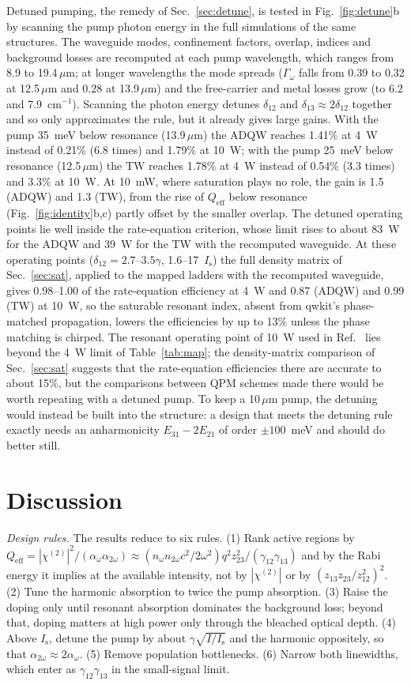 \documentclass[11pt]{article}
\newcommand{\chitwo}{\chi^{(2)}}
\newcommand{\um}{\,\mu\mathrm{m}}
\newcommand{\aw}{\alpha_{\omega}}
\newcommand{\aww}{\alpha_{2\omega}}
\newcommand{\Is}{I_\mathrm{s}}
\begin{document}
Detuned pumping, the remedy of Sec.~\ref{sec:detune}, is tested in Fig.~\ref{fig:detune}b by scanning the pump photon energy in the full simulations of the same structures. The waveguide modes, confinement factors, overlap, indices and background losses are recomputed at each pump wavelength, which ranges from 8.9 to 19.4$\um$; at longer wavelengths the mode spreads ($\Gamma_\omega$ falls from 0.39 to 0.32 at 12.5$\um$ and 0.28 at 13.9$\um$) and the free-carrier and metal losses grow (to 6.2 and 7.9~cm$^{-1}$). Scanning the photon energy detunes $\delta_{12}$ and $\delta_{13}\approx2\delta_{12}$ together and so only approximates the rule, but it already gives large gains. With the pump 35~meV below resonance (13.9$\um$) the ADQW reaches 1.41\% at 4~W instead of 0.21\% (6.8 times) and 1.79\% at 10~W; with the pump 25~meV below resonance (12.5$\um$) the TW reaches 1.78\% at 4~W instead of 0.54\% (3.3 times) and 3.3\% at 10~W. At 10~mW, where saturation plays no role, the gain is 1.5 (ADQW) and 1.3 (TW), from the rise of $Q_\mathrm{eff}$ below resonance (Fig.~\ref{fig:identity}b,c) partly offset by the smaller overlap. The detuned operating points lie well inside the rate-equation criterion, whose limit rises to about 83~W for the ADQW and 39~W for the TW with the recomputed waveguide. At these operating points ($\delta_{12}=2.7$--$3.5\gamma$, 1.6--17~$\Is$) the full density matrix of Sec.~\ref{sec:sat}, applied to the mapped ladders with the recomputed waveguide, gives 0.98--1.00 of the rate-equation efficiency at 4~W and 0.87 (ADQW) and 0.99 (TW) at 10~W, so the saturable resonant index, absent from qwkit's phase-matched propagation, lowers the efficiencies by up to 13\% unless the phase matching is chirped. The resonant operating point of 10~W used in Ref.~\cite{OwnbyN1} lies beyond the 4~W limit of Table~\ref{tab:map}; the density-matrix comparison of Sec.~\ref{sec:sat} suggests that the rate-equation efficiencies there are accurate to about 15\%, but the comparisons between QPM schemes made there would be worth repeating with a detuned pump. To keep a 10$\um$ pump, the detuning would instead be built into the structure: a design that meets the detuning rule exactly needs an anharmonicity $E_{31}-2E_{21}$ of order $\pm100$~meV and should do better still.

\section{Discussion}\label{sec:disc}
\emph{Design rules.} The results reduce to six rules. (1) Rank active regions by $Q_\mathrm{eff}=|\chitwo|^2/(\aw\aww)\approx(n_\omega n_{2\omega}c^2/2\omega^2)q^2z_{23}^2/(\gamma_{12}\gamma_{13})$ and by the Rabi energy it implies at the available intensity, not by $|\chitwo|$ or by $(z_{13}z_{23}/z_{12}^2)^2$. (2) Tune the harmonic absorption to twice the pump absorption. (3) Raise the doping only until resonant absorption dominates the background loss; beyond that, doping matters at high power only through the bleached optical depth. (4) Above $\Is$, detune the pump by about $\gamma\sqrt{I/\Is}$ and the harmonic oppositely, so that $\aww\approx2\aw$. (5) Remove population bottlenecks. (6) Narrow both linewidths, which enter as $\gamma_{12}\gamma_{13}$ in the small-signal limit.
\end{document}
